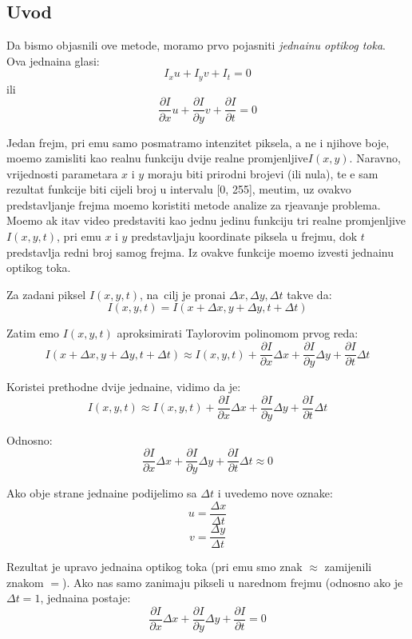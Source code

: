 \subsection{Uvod}
Da bismo objasnili ove metode, moramo prvo pojasniti \textit{jedna\ch inu opti\ch kog toka}. Ova jedna\ch ina glasi:
\[
I_xu+I_yv+I_t=0
\]
ili
\[
\frac{\partial I}{\partial x}u+\frac{\partial I}{\partial y}v+\frac{\partial I}{\partial t}=0
\]

Jedan frejm, pri \ch emu samo posmatramo intenzitet piksela, a ne i njihove boje, mo\zh emo zamisliti kao realnu funkciju dvije realne promjenljive$I(x,y)$. Naravno, vrijednosti parametara
$x$ i $y$ moraju biti prirodni brojevi (ili nula), te \cj e sam rezultat funkcije biti cijeli broj u intervalu [0, 255], me\dj utim, uz ovakvo predstavljanje frejma mo\zh emo koristiti metode analize za
rje\sh avanje problema. Mo\zh emo \ch ak \ch itav video predstaviti kao jednu jedinu funkciju tri realne promjenljive $I(x,y,t)$, pri \ch emu $x$ i $y$ predstavljaju koordinate piksela u frejmu,
dok $t$ predstavlja redni broj samog frejma. Iz ovakve funkcije mo\zh emo izvesti jedna\ch inu opti\ch kog toka.

Za zadani piksel $I(x,y,t)$, na\sh\ cilj je prona\cj i $\Delta x,\Delta y,\Delta t$ takve da:
\[
I(x,y,t)=I(x+\Delta x,y+\Delta y,t+\Delta t)
\]

Zatim \cj emo $I(x,y,t)$ aproksimirati Taylorovim polinomom prvog reda:
\[
I(x+\Delta x,y+\Delta y,t+\Delta t)\approx I(x,y,t)+\frac{\partial I}{\partial x}\Delta x+\frac{\partial I}{\partial y}\Delta y+\frac{\partial I}{\partial t}\Delta t
\]

Koriste\cj i prethodne dvije jedna\ch ine, vidimo da je:
\[
I(x,y,t)\approx I(x,y,t)+\frac{\partial I}{\partial x}\Delta x+\frac{\partial I}{\partial y}\Delta y+\frac{\partial I}{\partial t}\Delta t
\]

Odnosno:
\[
\frac{\partial I}{\partial x}\Delta x+\frac{\partial I}{\partial y}\Delta y+\frac{\partial I}{\partial t}\Delta t \approx 0
\]

Ako obje strane jedna\ch ine podijelimo sa $\Delta t$ i uvedemo nove oznake:
\[
u=\frac{\Delta x}{\Delta t}
\]
\[
v=\frac{\Delta y}{\Delta t}
\]

Rezultat je upravo jedna\ch ina opti\ch kog toka (pri \ch emu smo znak $\approx$ zamijenili znakom $=$). Ako nas samo zanimaju pikseli u narednom frejmu (odnosno ako je $\Delta t=1$,
jedna\ch ina postaje:
\[
\frac{\partial I}{\partial x}\Delta x+\frac{\partial I}{\partial y}\Delta y+\frac{\partial I}{\partial t}=0
\] 


